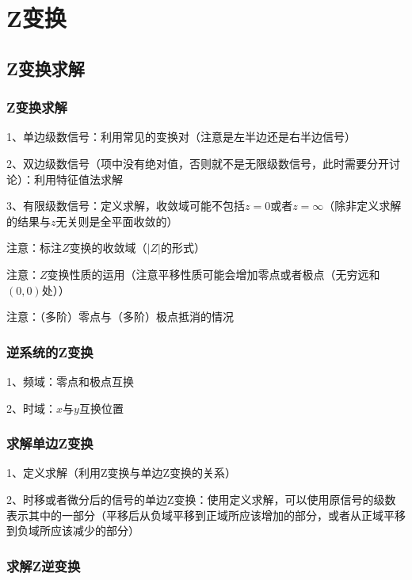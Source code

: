 \chapter{Z变换}

\section{Z变换求解}



\subsection{Z变换求解}

1、单边级数信号：利用常见的变换对（注意是左半边还是右半边信号）

2、双边级数信号（项中没有绝对值，否则就不是无限级数信号，此时需要分开讨论）：利用特征值法求解

3、有限级数信号：定义求解，收敛域可能不包括$z=0$或者$z=\infty$（除非定义求解的结果与$z$无关则是全平面收敛的）

注意：标注$Z$变换的收敛域（$|Z|$的形式）

注意：$Z$变换性质的运用（注意平移性质可能会增加零点或者极点（无穷远和$(0,0)$处））

注意：（多阶）零点与（多阶）极点抵消的情况



\subsection{逆系统的Z变换}

1、频域：零点和极点互换

2、时域：$x$与$y$互换位置



\subsection{求解单边Z变换}

1、定义求解（利用Z变换与单边Z变换的关系）

2、时移或者微分后的信号的单边Z变换：使用定义求解，可以使用原信号的级数表示其中的一部分（平移后从负域平移到正域所应该增加的部分，或者从正域平移到负域所应该减少的部分）



\subsection{求解Z逆变换}

